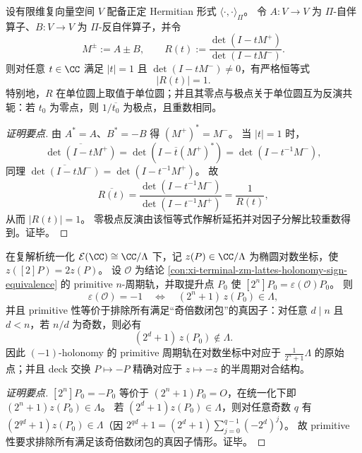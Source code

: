 \begin{conclusion}[Lee--Yang 型行列式比值的单位圆模守恒：\texorpdfstring{$(A^*=A,\ B^*=-B)\Rightarrow |R(e^{i\theta})|=1$}{unit-circle modulus}]\label{con:xi-terminal-zm-leyang-unit-circle-determinant-ratio}
设有限维复向量空间 \(V\) 配备正定 Hermitian 形式 \(\langle\cdot,\cdot\rangle_{\Pi}\)。
令 \(A:V\to V\) 为 \(\Pi\)-自伴算子、\(B:V\to V\) 为 \(\Pi\)-反自伴算子，并令
\[
M^{\pm}:=A\pm B,\qquad
R(t):=\frac{\det(I-tM^{+})}{\det(I-tM^{-})}.
\]
则对任意 \(t\in\CC\) 满足 \(|t|=1\) 且 \(\det(I-tM^{-})\neq 0\)，有严格恒等式
\[
|R(t)|=1.
\]
特别地，\(R\) 在单位圆上取值于单位圆；并且其零点与极点关于单位圆互为反演共轭：若 \(t_0\) 为零点，则 \(1/\overline{t_0}\) 为极点，且重数相同。
\end{conclusion}
\begin{proof}[证明要点]
由 \(A^*=A\)、\(B^*=-B\) 得 \((M^{+})^*=M^{-}\)。
当 \(|t|=1\) 时，
\[
\overline{\det(I-tM^{+})}
=\det(I-\overline{t}(M^{+})^*)
=\det(I-t^{-1}M^{-}),
\]
同理 \(\overline{\det(I-tM^{-})}=\det(I-t^{-1}M^{+})\)。
故
\[
\overline{R(t)}
=\frac{\det(I-t^{-1}M^{-})}{\det(I-t^{-1}M^{+})}
=\frac{1}{R(t)},
\]
从而 \(|R(t)|=1\)。
零极点反演由该恒等式作解析延拓并对因子分解比较重数得到。证毕。
\end{proof}

\begin{conclusion}\label{con:xi-terminal-zm-lattes-elliptic-log-halfperiod-coset}
在复解析统一化 \(\mathcal{E}(\CC)\cong \CC/\Lambda\) 下，记 \(z(P)\in\CC/\Lambda\) 为椭圆对数坐标，使 \(z([2]P)=2z(P)\)。
设 \(\mathcal{O}\) 为结论 \ref{con:xi-terminal-zm-lattes-holonomy-sign-equivalence} 的 primitive \(n\)-周期轨，并取提升点 \(P_0\) 使 \([2^{n}]P_0=\varepsilon(\mathcal{O})P_0\)。
则
\[
\varepsilon(\mathcal{O})=-1
\quad\Longleftrightarrow\quad
(2^{n}+1)\,z(P_0)\in\Lambda,
\]
并且 primitive 性等价于排除所有满足“奇倍数闭包”的真因子：对任意 \(d\mid n\) 且 \(d<n\)，若 \(n/d\) 为奇数，则必有
\[
(2^{d}+1)\,z(P_0)\notin\Lambda.
\]
因此 \((-1)\)-holonomy 的 primitive 周期轨在对数坐标中对应于 \(\frac{1}{2^{n}+1}\Lambda\) 的原始点；并且 deck 交换 \(P\mapsto -P\) 精确对应于 \(z\mapsto -z\) 的半周期对合结构。
\end{conclusion}
\begin{proof}[证明要点]
\([2^{n}]P_0=-P_0\) 等价于 \((2^{n}+1)P_0=O\)，在统一化下即 \((2^{n}+1)z(P_0)\in\Lambda\)。
若 \((2^{d}+1)z(P_0)\in\Lambda\)，则对任意奇数 \(q\) 有 \((2^{qd}+1)z(P_0)\in\Lambda\)（因 \(2^{qd}+1=(2^{d}+1)\sum_{j=0}^{q-1}(-2^d)^j\)）。
故 primitive 性要求排除所有满足该奇倍数闭包的真因子情形。证毕。
\end{proof}

